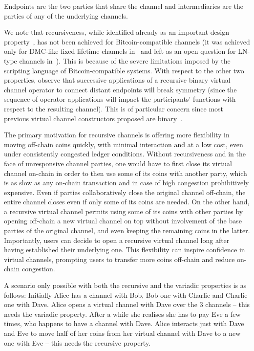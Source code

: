 Endpoints are the two parties that share the channel and intermediaries are
the parties of any of the underlying channels.

We note that recursiveness, while identified already as an important design
property~\cite{DBLP:conf/ccs/DziembowskiFH18}, has not been achieved for Bitcoin-compatible channels
(it was achieved only for DMC-like fixed lifetime channels in~\cite{10.1007/978-3-030-65411-5_18} and left as an open question for LN-type channels in~\cite{9519487}).
This is because of the severe limitations imposed by the scripting language of Bitcoin-compatible systems.
With respect to the other two properties, observe that successive applications
of a recursive binary virtual channel operator to connect distant endpoints will
break symmetry (since the sequence of operator applications will impact the
participants' functions with respect to the resulting channel). This is of
particular concern since most previous virtual channel constructors proposed are
binary~\cite{DBLP:conf/ccs/DziembowskiFH18,9519487,10.1007/978-3-030-65411-5_18}.

The primary motivation for recursive channels is offering more flexibility in
moving off-chain coins quickly, with minimal interaction and at a low cost, even
under consistently
congested ledger conditions. Without recursiveness and in the face of
unresponsive channel parties, one would have to first
close its virtual channel on-chain in order to then use some of its coins with
another party, which is as slow as any on-chain transaction and in case of high
congestion prohibitively expensive. Even if parties collaboratively
close the original channel off-chain, the entire
channel closes even if only some of its coins are needed. On the other hand, a
recursive
virtual channel permits using some of its coins with other parties by
opening off-chain a new virtual channel on top without involvement of the base parties of
the original channel, and even keeping the remaining coins in
the latter. Importantly, users can decide to open a recursive virtual channel
long after having established their underlying one. This flexibility can inspire confidence in virtual
channels, prompting users to transfer more coins off-chain and
reduce on-chain congestion.

A scenario only possible with both the recursive and the variadic
properties is as follows: Initially Alice has a channel with
Bob, Bob one with Charlie and Charlie one with Dave. Alice opens a virtual
channel with Dave over the $3$ channels -- this needs the variadic property.
After a while she realises she has to pay Eve a few
times, who happens to have a channel with Dave. Alice interacts just with
Dave and Eve to move half of her coins from her virtual channel with Dave to a
new one with Eve -- this needs the recursive property.


